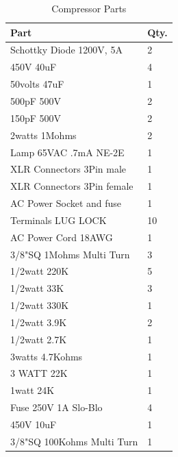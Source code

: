 \documentclass[journal]{IEEEtran}
\begin{document}
	\begin{table}[]
		\centering
		\caption{Compressor Parts}
		\label{tab:compressorParts}
		\begin{tabular}{l|l}
			Part                           & Qty. \\\hline
			Schottky Diode 1200V, 5A              & 2          \\
			450V 40uF                             & 4          \\
			50volts 47uF                          & 1          \\
			500pF 500V                            & 2          \\
			150pF 500V                            & 2          \\
			2watts 1Mohms                         & 2          \\
			Lamp 65VAC .7mA NE-2E                 & 1          \\
			XLR Connectors 3Pin male                & 1          \\
			XLR Connectors 3Pin female              & 1          \\
			AC Power Socket and fuse              & 1          \\
			Terminals LUG LOCK                    & 10         \\
			AC Power Cord 18AWG                   & 1          \\
			3/8"SQ 1Mohms Multi Turn              & 3          \\
			1/2watt 220K                          & 5          \\
			1/2watt 33K                           & 3          \\
			1/2watt 330K                          & 1          \\
			1/2watt 3.9K                          & 2          \\
			1/2watt 2.7K                          & 1          \\
			3watts 4.7Kohms                       & 1          \\
			3 WATT 22K                            & 1          \\
			1watt 24K                             & 1          \\
			Fuse 250V 1A Slo-Blo                  & 4          \\
			450V 10uF                             & 1          \\
			3/8"SQ 100Kohms Multi Turn            & 1          \\

\end{tabular}
\end{table}
\end{document}
